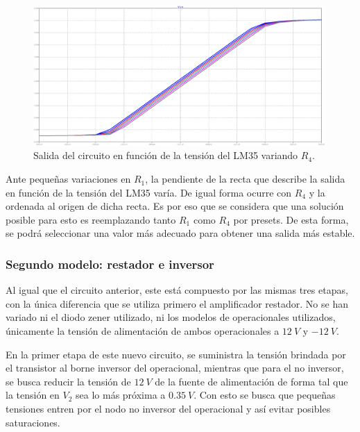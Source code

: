 \documentclass[a4paper]{article}
\begin{document}
\begin{figure}[H]
	\centering
	\includegraphics[width=0.99\textwidth]{Ejercicio6/Imagenes/StepR4-M1.png}
	\caption{Salida del circuito en función de la tensión del LM35 variando $R_4$.}
	\label{fig:r4-M1}
\end{figure}

Ante pequeñas variaciones en $R_1$, la pendiente de la recta que describe la salida en función de la tensión del LM35 varía. De igual forma ocurre con $R_4$ y la ordenada al origen de dicha recta. Es por eso que se considera que una solución posible para esto es reemplazando tanto $R_1$ como $R_4$ por presets. De esta forma, se podrá seleccionar una valor más adecuado para obtener una salida más estable.

\subsubsection{Segundo modelo: restador e inversor}

Al igual que el circuito anterior, este está compuesto por las mismas tres etapas, con la única diferencia que se utiliza primero el amplificador restador. No se han variado ni el diodo zener utilizado, ni los modelos de operacionales utilizados, únicamente la tensión de alimentación de ambos operacionales a $12 \ V$ y $-12 \ V$.

En la primer etapa de este nuevo circuito, se suministra la tensión brindada por el transistor al borne inversor del operacional, mientras que para el no inversor, se busca reducir la tensión de $12 \ V$ de la fuente de alimentación de forma tal que la tensión en $V_2$ sea lo más próxima a $0.35 \ V$. Con esto se busca que pequeñas tensiones entren por el nodo no inversor del operacional y así evitar posibles saturaciones.
\end{document}
